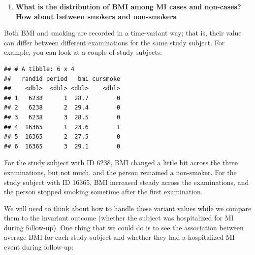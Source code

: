 \documentclass[
]{book}
\newenvironment{Shaded}{\begin{snugshade}}{\end{snugshade}}
\newcommand{\DataTypeTok}[1]{\textcolor[rgb]{0.13,0.29,0.53}{#1}}
\newcommand{\DecValTok}[1]{\textcolor[rgb]{0.00,0.00,0.81}{#1}}
\newcommand{\KeywordTok}[1]{\textcolor[rgb]{0.13,0.29,0.53}{\textbf{#1}}}
\newcommand{\NormalTok}[1]{#1}
\newcommand{\OperatorTok}[1]{\textcolor[rgb]{0.81,0.36,0.00}{\textbf{#1}}}
\newcommand{\OtherTok}[1]{\textcolor[rgb]{0.56,0.35,0.01}{#1}}
\newcommand{\StringTok}[1]{\textcolor[rgb]{0.31,0.60,0.02}{#1}}
\providecommand{\tightlist}{%
  \setlength{\itemsep}{0pt}\setlength{\parskip}{0pt}}
\begin{document}
\begin{enumerate}
\def\labelenumi{\arabic{enumi}.}
\setcounter{enumi}{3}
\tightlist
\item
  \textbf{What is the distribution of BMI among MI cases and non-cases? How about between smokers and non-smokers}
\end{enumerate}

Both BMI and smoking are recorded in a time-variant way; that is, their value can differ between different examinations for the same study subject. For example, you can look at a couple of study subjects:

\begin{Shaded}
\end{Shaded}

\begin{verbatim}
## # A tibble: 6 x 4
##   randid period   bmi cursmoke
##    <dbl>  <dbl> <dbl>    <dbl>
## 1   6238      1  28.7        0
## 2   6238      2  29.4        0
## 3   6238      3  28.5        0
## 4  16365      1  23.6        1
## 5  16365      2  27.5        0
## 6  16365      3  29.1        0
\end{verbatim}

For the study subject with ID 6238, BMI changed a little bit across the three examinations, but not much, and the person remained a non-smoker. For the study subject with ID 16365, BMI increased steady across the examinations, and the person stopped smoking sometime after the first examination.

We will need to think about how to handle these variant values while we compare them to the invariant outcome (whether the subject was hospitalized for MI during follow-up). One thing that we could do is to see the association between average BMI for each study subject and whether they had a hospitalized MI event during follow-up:

\begin{Shaded}
\end{Shaded}
\end{document}
